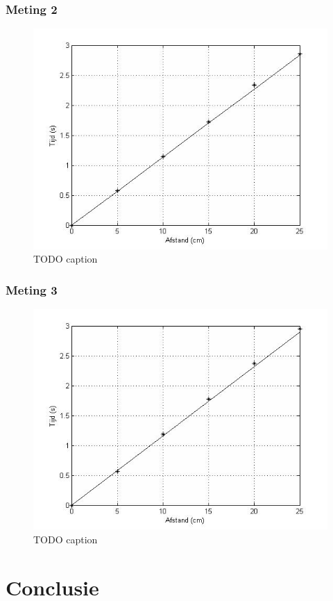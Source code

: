 \documentclass{report}
\begin{document}
\subsubsection*{Meting 2}
\begin{figure}
\begin{center}
\includegraphics[width=150mm] {Lineariteitsmeting2.jpg}
\caption{TODO caption}
\end{center}
\end{figure}

\subsubsection*{Meting 3}
\begin{figure}
\begin{center}
\includegraphics[width=150mm] {Lineariteitsmeting3.jpg}
\caption{TODO caption}
\end{center}
\end{figure}
\newpage
\section*{Conclusie}
\end{document}
